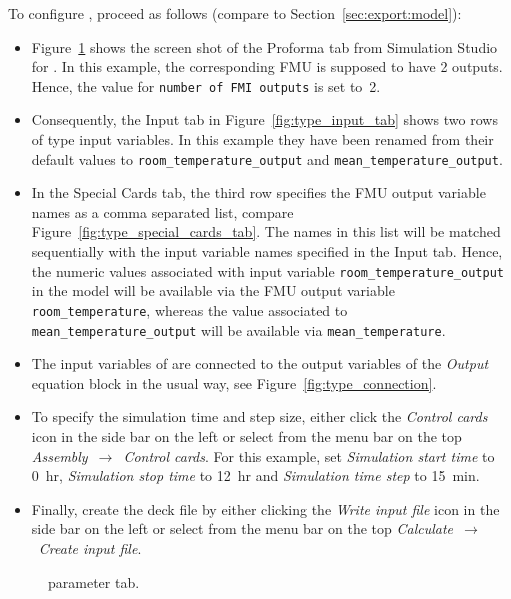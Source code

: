 To configure \typeb, proceed as follows (compare to Section~\ref{sec:export:model}):
\begin{itemize}
  \item Figure~\ref{fig:type_parameter_tab} shows the screen shot of the Proforma tab from Simulation Studio for \typeb.
  In this example, the corresponding FMU is supposed to have 2 outputs.
  Hence, the value for \texttt{number of FMI outputs} is set to~2.

  \item Consequently, the Input tab in Figure~\ref{fig:type_input_tab} shows two rows of type input variables.
  In this example they have been renamed from their default values to \texttt{room\_temperature\_output} and \texttt{mean\_temperature\_output}.

  \item In the Special Cards tab, the third row specifies the FMU output variable names as a comma separated list, compare Figure~\ref{fig:type_special_cards_tab}.
  The names in this list will be matched sequentially with the input variable names specified in the Input tab.
  Hence, the numeric values associated with \typeb input variable \texttt{room\_temperature\_output} in the \trnsys model will be available via the FMU output variable \texttt{room\_temperature}, whereas the value associated to \texttt{mean\_temperature\_output} will be available via \texttt{mean\_temperature}.

  \item The input variables of \typeb are connected to the output variables of the \emph{Output} equation block in the usual way, see Figure~\ref{fig:type_connection}.

  \item To specify the simulation time and step size, either click the \textit{Control cards} icon in the side bar on the left or select from the menu bar on the top \textit{Assembly}~$\rightarrow$~\textit{Control cards}.
  For this example, set \textit{Simulation start time} to 0~hr, \textit{Simulation stop time} to 12~hr and \textit{Simulation time step} to 15~min.

  \item Finally, create the deck file by either clicking the \textit{Write input file} icon in the side bar on the left or select from the menu bar on the top \textit{Calculate}~$\rightarrow$~\textit{Create input file}.

\end{itemize}

\begin{figure}[h!]
\vspace*{5mm}
\caption{\typeb parameter tab.}
\label{fig:type_parameter_tab}
\end{figure}

